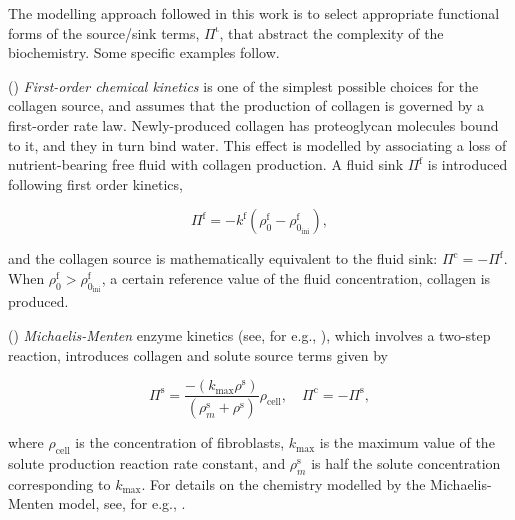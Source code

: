 The modelling approach followed in this work is to select appropriate
functional forms of the source/sink terms, $\Pi^{\mathrm{\iota}}$,
that abstract the complexity of the biochemistry. Some specific
examples follow.

() {\em First-order chemical kinetics} is one of the
simplest possible choices for the collagen source, and assumes that
the production of collagen is governed by a first-order rate
law. Newly-produced collagen has proteoglycan molecules bound to it,
and they in turn bind water. This effect is modelled by associating a
loss of nutrient-bearing free fluid with collagen production. A fluid
sink $\Pi^\mathrm{f}$ is introduced following first order kinetics,

\begin{equation}
\Pi^\mathrm{f} = -k^\mathrm{f}(\rho_0^\mathrm{f} -
\rho_{0_\mathrm{ini}}^\mathrm{f}),
\label{first-order-chemical-kinetics-source}
\end{equation}

\noindent and the collagen source is mathematically equivalent to the
fluid sink: $\Pi^\mathrm{c} = -\Pi^\mathrm{f}$. When
$\rho_{0}^\mathrm{f} > \rho_{0_\mathrm{ini}}^\mathrm{f}$, a certain
reference value of the fluid concentration, collagen is produced.

() {\em Michaelis-Menten} enzyme kinetics (see, for
e.g., \cite{Sengersetal:2004}), which involves a two-step reaction, 
introduces collagen and solute source terms given by

\begin{equation}
\Pi^\mathrm{s} =
    \frac{-(k_{\mathrm{max}}\rho^{\mathrm{s}})}
    {(\rho^{\mathrm{s}}_m+\rho^{\mathrm{s}})}
    \rho_{\mathrm{cell}}, \quad\Pi^\mathrm{c} = -\Pi^\mathrm{s},
\label{enzyme-kinetics-source}
\end{equation}

\noindent where $\rho_{\mathrm{cell}}$ is the concentration of
fibroblasts, $k_{\mathrm{max}}$ is the maximum value of the solute
production reaction rate constant, and $\rho^{\mathrm{s}}_m$ is half
the solute concentration corresponding to $k_{\mathrm{max}}$. For
details on the chemistry modelled by the Michaelis-Menten model, see,
for e.g., \citet{sbromadill}.

